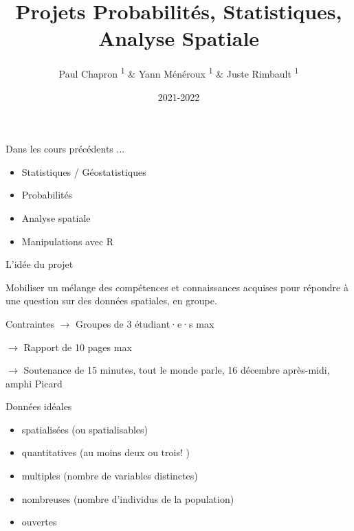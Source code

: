 \documentclass{beamer}
\title{Projets Probabilités, Statistiques, Analyse Spatiale}
\subtitle{}
\date{2021-2022}
\author{Paul Chapron \textsuperscript{1} \& Yann Ménéroux \textsuperscript{1} \& Juste Rimbault \textsuperscript{1}}
\institute{ \textsuperscript{1}IGN-ENSG-UGE}
\begin{document}
\maketitle

\begin{frame}{Dans les cours précédents ... }

\begin{itemize}
  \item Statistiques / Géostatistiques 
  \item Probabilités 
  \item Analyse spatiale 
  \item Manipulations avec R 
\end{itemize}

\end{frame}


\begin{frame}{L'idée du projet}

Mobiliser un mélange des compétences et connaissances acquises pour \alert{répondre à une question} sur des données spatiales, en groupe.




\end{frame}






\begin{frame}{Contraintes}
$\rightarrow $ Groupes de 3 étudiant·e·s max \\ 
\vspace{1cm}

$\rightarrow $ Rapport de 10 pages max\\
\vspace{1cm}

$\rightarrow $ Soutenance de 15 minutes, tout le monde parle, 16 décembre après-midi, amphi Picard 

\end{frame}

\begin{frame}{Données idéales}

\begin{itemize}
\item spatialisées (ou spatialisables)
\item quantitatives (au moins deux ou trois! )
\item multiples (nombre de variables distinctes)
\item nombreuses (nombre d'individus de la population)
\item ouvertes 
\end{itemize}
\end{frame}
\end{document}
